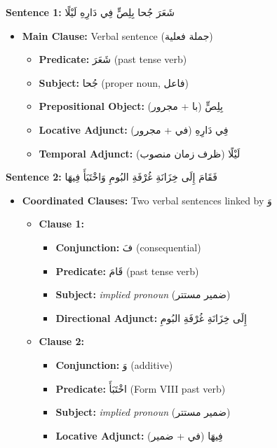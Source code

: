 \documentclass[letter,12pt]{article}
\begin{document}
\begin{tcolorbox}[colback=boxcolor,colframe=headercolor,title=\textbf{Syntactic Tree Structure},breakable]
\textbf{Sentence 1:} \textarabic{شَعَرَ جُحا بِلِصٍّ فِي دَارِهِ لَيْلًا}

\begin{itemize}
\item \textbf{Main Clause:} Verbal sentence (\textarabic{جملة فعلية})
  \begin{itemize}
  \item \textbf{Predicate:} \textarabic{شَعَرَ} (past tense verb)
  \item \textbf{Subject:} \textarabic{جُحا} (proper noun, \textarabic{فاعل})
  \item \textbf{Prepositional Object:} \textarabic{بِلِصٍّ} (\textarabic{با + مجرور})
  \item \textbf{Locative Adjunct:} \textarabic{فِي دَارِهِ} (\textarabic{في + مجرور})
  \item \textbf{Temporal Adjunct:} \textarabic{لَيْلًا} (\textarabic{ظرف زمان منصوب})
  \end{itemize}
\end{itemize}

\textbf{Sentence 2:} \textarabic{فَقَامَ إِلَى خِزَانَةِ غُرْفَةِ البُومِ وَاخْتَبَأَ فِيهَا}

\begin{itemize}
\item \textbf{Coordinated Clauses:} Two verbal sentences linked by \textarabic{وَ}
  \begin{itemize}
  \item \textbf{Clause 1:}
    \begin{itemize}
    \item \textbf{Conjunction:} \textarabic{فَ} (consequential)
    \item \textbf{Predicate:} \textarabic{قَامَ} (past tense verb)
    \item \textbf{Subject:} \textit{implied pronoun} (\textarabic{ضمير مستتر})
    \item \textbf{Directional Adjunct:} \textarabic{إِلَى خِزَانَةِ غُرْفَةِ البُومِ}
    \end{itemize}
  \item \textbf{Clause 2:}
    \begin{itemize}
    \item \textbf{Conjunction:} \textarabic{وَ} (additive)
    \item \textbf{Predicate:} \textarabic{اخْتَبَأَ} (Form VIII past verb)
    \item \textbf{Subject:} \textit{implied pronoun} (\textarabic{ضمير مستتر})
    \item \textbf{Locative Adjunct:} \textarabic{فِيهَا} (\textarabic{في + ضمير})
    \end{itemize}
  \end{itemize}
\end{itemize}
\end{tcolorbox}
\end{document}
